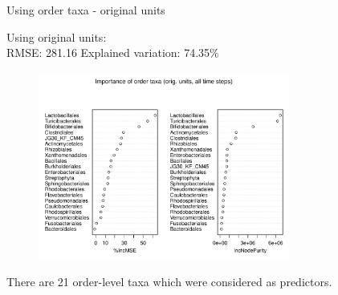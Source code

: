 \documentclass{beamer}
\begin{document}
\begin{frame}{Using order taxa - original units}

  {\scriptsize
    
  \noindent Using original units:\\
  RMSE: 281.16  \hspace{0.05in}  Explained variation: 74.35\%

  \begin{center}
    \begin{figure}
      \includegraphics[width=3.25in]{../only_orders/all_time_steps/orig_units_all_data_orders_imp_plot}
    \end{figure}
  \end{center}
  \vspace{-0.25in}

\noindent There are 21 order-level taxa which were considered as predictors.
}

\end{frame}
\end{document}
